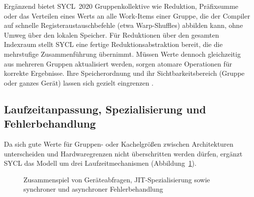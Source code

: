 \documentclass[12pt,a4paper]{article}
\begin{document}
Ergänzend bietet SYCL~2020 Gruppenkollektive wie Reduktion, Präfixsumme
oder das Verteilen eines Werts an alle Work-Items einer Gruppe, die der Compiler
auf schnelle Registeraustauschbefehle (etwa Warp-Shuffles) abbilden kann, ohne
Umweg über den lokalen Speicher. Für Reduktionen über den gesamten Indexraum
stellt SYCL eine fertige Reduktionsabstraktion bereit, die die mehrstufige
Zusammenführung übernimmt. Müssen Werte dennoch gleichzeitig aus mehreren
Gruppen aktualisiert werden, sorgen atomare Operationen für korrekte
Ergebnisse. Ihre Speicherordnung und ihr Sichtbarkeitsbereich (Gruppe oder
ganzes Gerät) lassen sich gezielt eingrenzen \cite{khronos2020sycl}.

\subsection{Laufzeitanpassung, Spezialisierung und Fehlerbehandlung}\label{sec:k-anpassung}

Da sich gute Werte für Gruppen- oder Kachelgrößen zwischen Architekturen
unterscheiden und Hardwaregrenzen nicht überschritten werden dürfen, ergänzt
SYCL das Modell um drei Laufzeitmechanismen
(Abbildung~\ref{fig:laufzeitanpassung}).

\begin{figure}[htbp]
\centering
{}
\caption[Laufzeitanpassung, Spezialisierung und zweigeteilte Fehlerbehandlung]{Zusammenspiel von Geräteabfragen, JIT-Spezialisierung sowie synchroner und asynchroner Fehlerbehandlung}
\label{fig:laufzeitanpassung}
\end{figure}
\end{document}
